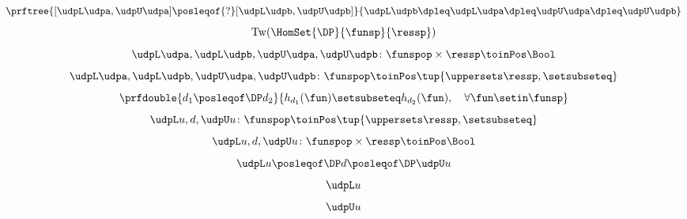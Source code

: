 {\begin{forslides}
        \begin{equation}
            \label{eq:order_udp_1}
            \prftree{[\udpL\udpa,\udpU\udpa] \posleqof{?} [\udpL\udpb,\udpU\udpb]}{\udpL\udpb\dpleq\udpL\udpa\dpleq\udpU\udpa\dpleq\udpU\udpb}
        \end{equation}
        \begin{equation}
            \label{eq:order_udp_2}
            \text{Tw}(\HomSet{\DP}{\funsp}{\ressp})
        \end{equation}
        \begin{equation}
            \label{eq:order_udp_3}
            \udpL\udpa,\udpL\udpb,\udpU\udpa,\udpU\udpb\colon \funspop \times \ressp \toinPos \Bool
        \end{equation}
        \begin{equation}
            \label{eq:order_udp_4}
            \udpL\udpa,\udpL\udpb,\udpU\udpa,\udpU\udpb\colon \funspop \toinPos  \tup{\uppersets \ressp, \setsubseteq}
        \end{equation}
        \begin{equation}
            \label{eq:upos_dp_def_4}
            \prfdouble{
                d_1\posleqof\DP d_2
            }{
                h_{d_1}(\fun)\setsubseteq h_{d_2}(\fun), \quad \forall \fun \setin \funsp
            }
        \end{equation}
        \begin{equation}
            \label{eq:order_udp_5}
            \udpL u,d,\udpU u\colon \funspop \toinPos  \tup{\uppersets \ressp, \setsubseteq}
        \end{equation}
        \begin{equation}
            \label{eq:order_udp_6}
            \udpL u,d,\udpU u\colon  \funspop \times \ressp \toinPos \Bool
        \end{equation}
        \begin{equation}
            \label{eq:order_udp_7}
            \udpL u \posleqof\DP d \posleqof\DP \udpU u
        \end{equation}
        \begin{equation}
            \label{eq:order_udp_8}
            \udpL u
        \end{equation}
        \begin{equation}
            \label{eq:order_udp_9}
            \udpU u
        \end{equation}
        \begin{equation}
            \label{eq:order_udp_10}
            \begin{aligned}

\end{aligned}
\end{equation}
\end{forslides}}
